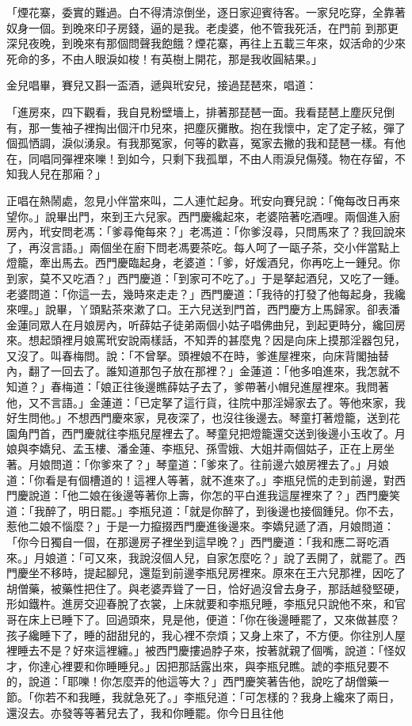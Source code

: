 「煙花寨，委實的難過。白不得清涼倒坐，逐日家迎賓待客。一家兒吃穿，全靠著奴身一個。到晚來印子房錢，逼的是我。老虔婆，他不管我死活，在門前 到那更深兒夜晚，到晚來有那個問聲我飽餓？煙花寨，再往上五載三年來，奴活命的少來死命的多，不由人眼淚如梭！有英樹上開花，那是我收圓結果。」

金兒唱畢，賽兒又斟一盃酒，遞與玳安兒，接過琵琶來，唱道：

「進房來，四下觀看，我自見粉壁墻上，排著那琵琶一面。我看琵琶上塵灰兒倒有，那一隻袖子裡掏出個汗巾兒來，把塵灰攤散。抱在我懷中，定了定子絃，彈了個孤恓調，淚似湧泉。有我那冤家，何等的歡喜，冤家去撇的我和琵琶一樣。有他在，同唱同彈裡來嚛！到如今，只剩下我孤單，不由人雨淚兒傷殘。物在存留，不知我人兒在那廂？」

正唱在熱鬧處，忽見小伴當來叫，二人連忙起身。玳安向賽兒說：「俺每改日再來望你。」說畢出門，來到王六兒家。西門慶纔起來，老婆陪著吃酒哩。兩個進入廚房內，玳安問老馮：「爹尋俺每來？」老馮道：「你爹沒尋，只問馬來了？我回說來了，再沒言語。」兩個坐在廚下問老馮要茶吃。每人呵了一甌子茶，交小伴當點上燈籠，牽出馬去。西門慶臨起身，老婆道：「爹，好煖酒兒，你再吃上一鍾兒。你到家，莫不又吃酒？」西門慶道：「到家可不吃了。」于是拏起酒兒，又吃了一鍾。老婆問道：「你這一去，幾時來走走？」西門慶道：「我待的打發了他每起身，我纔來哩。」說畢，丫頭點茶來漱了口。王六兒送到門首，西門慶方上馬歸家。卻表潘金蓮同眾人在月娘房內，听薛姑子徒弟兩個小姑子唱佛曲兒，到起更時分，纔回房來。想起頭裡月娘罵玳安說兩樣話，不知弄的甚麼鬼？因是向床上摸那淫器包兒，又沒了。叫春梅問。說：「不曾拏。頭裡娘不在時，爹進屋裡來，向床背閣抽替內，翻了一回去了。誰知道那包子放在那裡？」金蓮道：「他多咱進來，我怎就不知道？」春梅道：「娘正往後邊瞧薛姑子去了，爹帶著小帽兒進屋裡來。我問著他，又不言語。」金蓮道：「已定拏了這行貨，往院中那淫婦家去了。等他來家，我好生問他。」不想西門慶來家，見夜深了，也沒往後邊去。琴童打著燈籠，送到花園角門首，西門慶就往李瓶兒屋裡去了。琴童兒把燈籠還交送到後邊小玉收了。月娘與李嬌兒、孟玉樓、潘金蓮、李瓶兒、孫雪娥、大姐并兩個姑子，正在上房坐著。月娘問道：「你爹來了？」琴童道：「爹來了。往前邊六娘房裡去了。」月娘道：「你看是有個槽道的！這裡人等著，就不進來了。」李瓶兒慌的走到前邊，對西門慶說道：「他二娘在後邊等著你上壽，你怎的平白進我這屋裡來了？」西門慶笑道：「我醉了，明日罷。」李瓶兒道：「就是你醉了，到後邊也接個鍾兒。你不去，惹他二娘不惱麼？」于是一力攛掇西門慶進後邊來。李嬌兒遞了酒，月娘問道：「你今日獨自一個，在那邊房子裡坐到這早晚？」西門慶道：「我和應二哥吃酒來。」月娘道：「可又來，我說沒個人兒，自家怎麼吃？」說了丟開了，就罷了。西門慶坐不移時，提起腳兒，還踅到前邊李瓶兒房裡來。原來在王六兒那裡，因吃了胡僧藥，被藥性把住了。與老婆弄聳了一日，恰好過沒曾去身子，那話越發堅硬，形如鐵杵。進房交迎春脫了衣裳，上床就要和李瓶兒睡，李瓶兒只說他不來，和官哥在床上已睡下了。回過頭來，見是他，便道：「你在後邊睡罷了，又來做甚麼？孩子纔睡下了，睡的甜甜兒的，我心裡不奈煩；又身上來了，不方便。你往別人屋裡睡去不是？好來這裡纏。」被西門慶摟過脖子來，按著就親了個嘴，說道：「怪奴才，你達心裡要和你睡睡兒。」因把那話露出來，與李瓶兒瞧。諕的李瓶兒要不的，說道：「耶嚛！你怎麼弄的他這等大？」西門慶笑著告他，說吃了胡僧藥一節。「你若不和我睡，我就急死了。」李瓶兒道：「可怎樣的？我身上纔來了兩日，還沒去。亦發等等著兒去了，我和你睡罷。你今日且往他